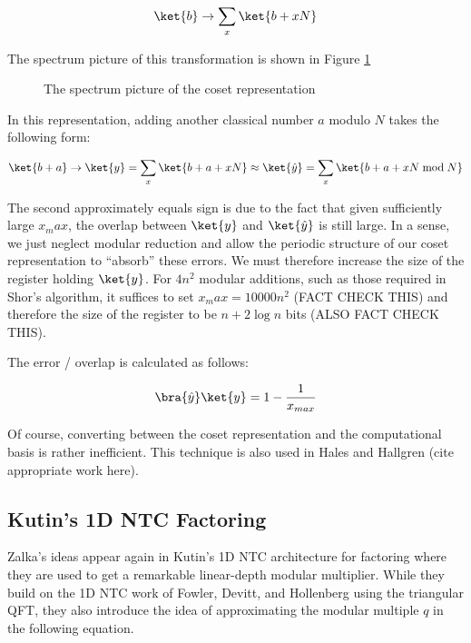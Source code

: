 \begin{equation}
\ket{b} \rightarrow \sum_{x} \ket{b + xN}
\end{equation}

The spectrum picture of this transformation is shown in
Figure \ref{fig:coset-spectrum}

\begin{figure}
\label{fig:coset-spectrum}
\caption{The spectrum picture of the coset representation}
\end{figure}

In this representation, adding another classical number $a$ modulo $N$
takes the following form:

\begin{equation}
\ket{b+a} \rightarrow \ket{y} = \sum_{x} \ket{b + a + xN} \approx
\ket{\hat{y}} = \sum_{x} \ket{b + a + xN \bmod N}
\end{equation}

The second approximately equals sign is due to the fact that given
sufficiently large $x_max$, the overlap between $\ket{y}$ and
$\ket{\hat{y}}$ is still large. In a sense, we just neglect modular reduction
and allow the periodic structure of our coset representation to ``absorb''
these errors. We must therefore increase the size of the register holding
$\ket{y}$. For $4n^2$ modular additions, such as those required in Shor's
algorithm, it suffices to set $x_max = 10000n^2$ (FACT CHECK THIS) and
therefore the size of the register to be $n + 2\log{n}$ bits (ALSO FACT
CHECK THIS).

The error / overlap is calculated as follows:

\begin{equation}
\bra{\hat{y}}\ket{y} = 1 - \frac{1}{x_{max}}
\end{equation}

Of course, converting between the coset representation and the computational
basis is rather inefficient. This technique is also used in
Hales and Hallgren (cite appropriate work here).

\subsection{Kutin's 1D NTC Factoring}

Zalka's ideas appear again in Kutin's 1D NTC architecture for factoring
\cite{Kutin2006}
where they are used to get a remarkable linear-depth modular multiplier.
While they build on the 1D NTC work of Fowler, Devitt, and Hollenberg
\cite{Fowler2004} using the triangular QFT, they also introduce the
idea of approximating the modular multiple $q$ in the following
equation.


